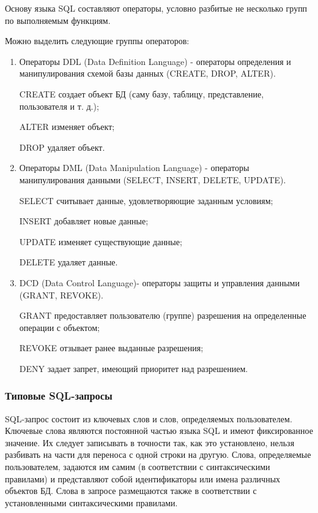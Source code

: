 \documentclass[12pt,a4paper,oneside]{article} %
\begin{document}
Основу языка SQL составляют операторы, условно разбитые не несколько \linebreak
групп по выполняемым функциям.

Можно выделить следующие группы операторов:

\begin{enumerate}
\item Операторы DDL (Data Definition Language) - операторы определения и \linebreak
    манипулирования схемой базы данных (CREATE, DROP, ALTER).

    CREATE создает объект БД (саму базу, таблицу, представление, \linebreak
    пользователя и т. д.);

    ALTER изменяет объект;

    DROP удаляет объект.

\item Операторы DML (Data Manipulation Language) - операторы \linebreak
манипулирования данными (SELECT, INSERT, DELETE, UPDATE).

    SELECT считывает данные, удовлетворяющие заданным условиям;

    INSERT добавляет новые данные;

    UPDATE изменяет существующие данные;

    DELETE удаляет данные.

\item DCD (Data Control Language)- операторы защиты и управления данными \linebreak
(GRANT, REVOKE).

    GRANT предоставляет пользователю (группе) разрешения на \linebreak
    определенные операции с объектом;

    REVOKE отзывает ранее выданные разрешения;

    DENY задает запрет, имеющий приоритет над разрешением.
\end{enumerate}

\subsubsection{Типовые SQL-запросы}

SQL-запрос состоит из ключевых слов и слов, определяемых пользователем. \linebreak
Ключевые слова являются постоянной частью языка SQL и имеют \linebreak
фиксированное значение. Их следует записывать в точности так, как это \linebreak
установлено, нельзя разбивать на части для переноса с одной строки \linebreak
на другую. Слова, определяемые пользователем, задаются им самим \linebreak
(в соответствии с синтаксическими правилами) и представляют собой \linebreak
идентификаторы или имена различных объектов БД. Слова в запросе \linebreak
размещаются также в соответствии с установленными синтаксическими \linebreak
правилами.
\end{document}

